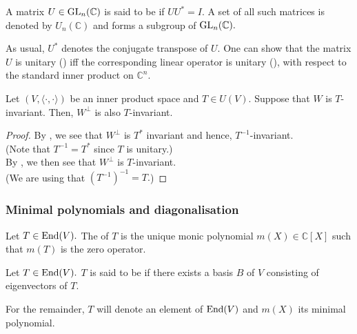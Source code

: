 \begin{defn}%
	\label{defn:unitarymatrix}
	A matrix $U \in \operatorname{GL}_n(\mathbb{C})$ is said to be  if $UU^* = I.$ A set of all such matrices is denoted by $U_n(\mathbb{C})$ and forms a subgroup of $\operatorname{GL}_n(\mathbb{C}).$
\end{defn}
As usual, $U^*$ denotes the conjugate transpose of $U.$ One can show that the matrix $U$ is unitary () iff the corresponding linear operator is unitary (), with respect to the standard inner product on $\mathbb{C}^n.$

\begin{cor} \label{cor:unitaryinvariance}
	Let $(V, \langle \cdot, \cdot\rangle)$ be an inner product space and $T \in U(V).$ Suppose that $W$ is $T$-invariant. Then, $W^\perp$ is also $T$-invariant.
\end{cor}
\begin{proof} 
	By , we see that $W^\perp$ is $T^*$ invariant and hence, $T^{-1}$-invariant.\\
	(Note that $T^{-1} = T^*$ since $T$ is unitary.)\\
	By , we then see that $W^\perp$ is $T$-invariant. \\
	(We are using that $(T^{-1})^{-1} = T.$)
\end{proof}

\subsubsection{Minimal polynomials and diagonalisation} 

\begin{defn}%
	Let $T \in \operatorname{End}(V).$ The  of $T$ is the unique monic polynomial $m(X) \in \mathbb{C}[X]$ such that $m(T)$ is the zero operator.
\end{defn} 

\begin{defn}%
	Let $T \in \operatorname{End}(V).$ $T$ is said to be  if there exists a basis $B$ of $V$ consisting of eigenvectors of $T.$
\end{defn}

For the remainder, $T$ will denote an element of $\operatorname{End}(V)$ and $m(X)$ its minimal polynomial.


